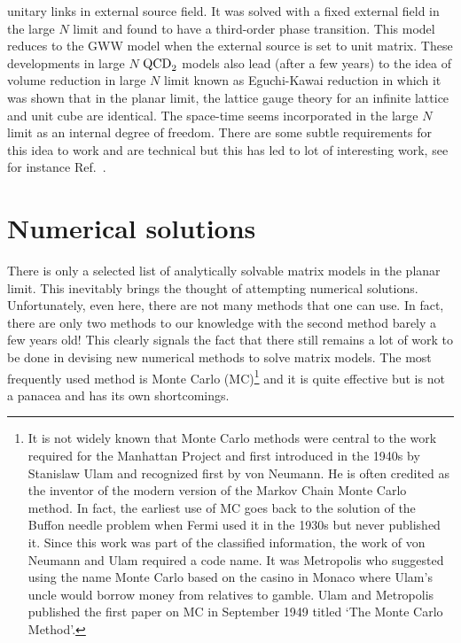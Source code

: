 \documentclass[letter,11pt]{article}
\begin{document}
unitary links in external source field. It was solved with a fixed external field in the large $N$ limit and found to have a 
third-order phase transition. This model reduces to the GWW model when the external source is set to unit matrix. 
These developments in large $N$ $\rm{QCD}_{2}$ models also lead (after a few years) to the idea of volume reduction 
in large $N$ limit known as Eguchi-Kawai reduction \cite{Eguchi:1982nm} in which it was shown that in the planar limit, 
the lattice gauge theory for an infinite lattice and unit cube are identical. The space-time seems incorporated in the large 
$N$ limit as an internal degree of freedom. There are some subtle requirements for this idea to work and are technical 
but this has led to lot of interesting work, see for instance Ref.~\cite{Kovtun:2007py}. 
 
\section{\label{sec:NSOL}Numerical solutions} 
There is only a selected list of analytically solvable matrix models in the planar limit. This inevitably brings 
the thought of attempting numerical solutions. Unfortunately, even here, there are not many methods that one can use. 
In fact, there are only two methods to our knowledge with the second method barely a few years old! This clearly signals 
the fact that there still remains a lot of work to be done in devising new numerical 
methods to solve matrix models. The most frequently used method is Monte Carlo (MC)\footnote{
It is not widely known that Monte Carlo methods were central to the work required for the Manhattan Project
and first introduced in the 1940s by Stanislaw Ulam and recognized first by von Neumann. 
He is often credited as the inventor of the modern version of the Markov Chain Monte Carlo 
method. In fact, the earliest use of MC goes back to the solution of the Buffon needle problem when Fermi used it in the 
1930s but never published it. 
Since this work was part of the classified information, the work of von Neumann and Ulam required a code name. It was Metropolis who 
suggested using the name Monte Carlo based on the casino in 
Monaco where Ulam's uncle would borrow money from relatives to gamble. Ulam and Metropolis
published the first paper on MC in September 1949 titled `The Monte Carlo Method'.} 
and it is quite effective but is not a panacea and has its own shortcomings. 
\end{document}
